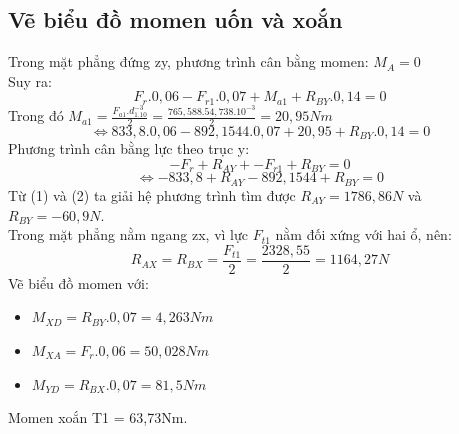 \subsection{Vẽ biểu đồ momen uốn và xoắn}
Trong mặt phẳng đứng zy, phương trình cân bằng momen: $M_{A} = 0$ \\
Suy ra:
\[
    F_r .0,06 - F_{r1}.0,07 + M_{a1} + R_{BY}.0,14 = 0
\]
Trong đó $M_{a1} = \frac{F_{a1}.d_1.10^{-3}}{2} = \frac{765,588.54,738.10^{-3}}{2} = 20,95Nm$ \\
\begin{equation}
    \Leftrightarrow 833,8.0,06 - 892,1544.0,07 + 20,95 + R_{BY}.0,14 = 0
\end{equation}
Phương trình cân bằng lực theo trục y: \\
\[
    -F_r + R_{AY} + -F_{r1} + R_{BY} = 0
\]
\begin{equation}
    \Leftrightarrow -833,8 + R_{AY} - 892,1544 + R_{BY} = 0
\end{equation}
Từ (1) và (2) ta giải hệ phương trình tìm được $R_{AY} = 1786,86N$ và $R_{BY} = -60,9N$. \\
Trong mặt phẳng nằm ngang zx, vì lực $F_{t1}$ nằm đối xứng với hai ổ, nên: 
\[
    R_{AX} = R_{BX} = \frac{F_{t1}}{2} = \frac{2328,55}{2} = 1164,27N
\]
Vẽ biểu đồ momen với:
\begin{itemize}
    \item $M_{XD} = R_{BY}.0,07 = 4,263Nm$
    \item $M_{XA} = F_r.0,06 = 50,028Nm$
    \item $M_{YD} = R_{BX}.0,07 = 81,5Nm$
\end{itemize}   
Momen xoắn T1 = 63,73Nm. \\
